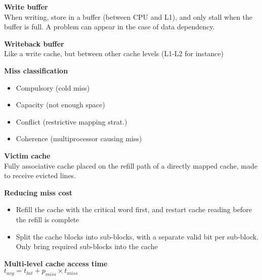 \documentclass[10pt,letterpaper,landscape]{report}
\newcommand{\boxheight}{21.59cm}
\newcommand{\boxwidth}{8.85cm}
\begin{document}
\begin{small}
{\begin{minipage}[t][\boxheight][c]{\boxwidth}
    \textbf{Write buffer}\\
    When writing, store in a buffer (between CPU and L1), and only stall when the buffer is full. A problem can appear in the case of data dependency.
    
    \textbf{Writeback buffer}\\
    Like a write cache, but between other cache levels (L1-L2 for instance)
    
    \textbf{Miss classification}
    \begin{itemize}
        \item Compulsory (cold miss)
        \item Capacity (not enough space)
        \item Conflict (restrictive mapping strat.)
        \item Coherence (multiprocessor causing miss)
    \end{itemize}
    
    \textbf{Victim cache}\\
    Fully associative cache placed on the refill path of a directly mapped cache, made to receive evicted lines.
    
    \textbf{Reducing miss cost}
    \begin{itemize}
        \item Refill the cache with the critical word first, and restart cache reading before the refill is complete 
        \item Split the cache blocks into sub-blocks, with a separate valid bit per sub-block. Only bring required sub-blocks into the cache
    \end{itemize}
    
    \textbf{Multi-level cache access time}\\
    $t_{avg} = t_{hit} + p_{miss} \times t_{miss} $ 
    
\end{minipage}
}\fbox{
\begin{minipage}[t][\boxheight][c]{\boxwidth}


	TODO



\end{minipage}
}
\end{small}
\end{document}
